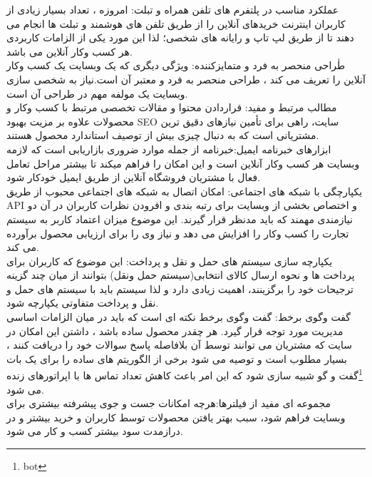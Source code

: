 \documentclass[12pt]{report}
\begin{document}
عملکرد مناسب در پلتفرم های تلفن همراه و تبلت: امروزه ، تعداد بسیار زیادی از کاربران اینترنت خریدهای آنلاین را از طریق تلفن های هوشمند و تبلت ها انجام می دهند تا از طریق لپ تاپ و رایانه های شخصی؛ لذا این مورد یکی از الزامات کاربردی هر کسب وکار آنلاین می باشد.\\
طٰراحی منحصر به فرد و متمایزکننده: ویژگی دیگری که یک وبسایت یک کسب وکار آنلاین را تعریف می کند ، طراحی منحصر به فرد و معتبر آن است.نیاز به شخصی سازی وبسایت یک مولفه مهم در طراحی آن است.\\
مطالب مرتبط و مفید: قراردادن محتوا و مقالات تخصصی مرتبط با کسب وکار و محصولات علاوه بر مزیت بهبود SEO سایت، راهی برای تأمین نیازهای دقیق ترین مشتریانی است که به دنبال چیزی بیش از توصیف استاندارد محصول هستند.\\
ابزارهای خبرنامه ایمیل:خبرنامه از جمله موارد ضروری بازاریابی است که لازمه وبسایت هر کسب وکار آنلاین است و  این امکان را فراهم میکند تا بیشتر مراحل تعامل فعال با مشتریان فروشگاه آنلاین از طریق ایمیل خودکار شود.\\ 
یکپارچگی با شبکه های اجتماعی: امکان اتصال به  شبکه های اجتماعی محبوب از طریق API و اختصاص بخشی از وبسایت برای رتبه بندی و افرودن نظرات کاربران در آن دو نیازمندی مهمند که باید مدنظر قرار گیرند. این  موضوع میزان اعتماد کاربر به سیستم تجارت را کسب وکار را افزایش می دهد و نیاز وی را برای ارزیابی محصول برآورده می کند.\\
یکپارچه سازی سیستم های حمل و نقل و پرداخت: این موضوع که کاربران برای پرداخت ها و نحوه ارسال کالای انتخابی(سیستم حمل ونقل) بتوانند از میان چند گزینه ترجیحات خود را برگزینند، اهمیت زیادی دارد و لذا سیستم باید با سیستم های حمل و نقل و پرداخت متفاوتی یکپارچه شود.\\
گفت وگوی برخط: گفت وگوی برخط نکته ای است که باید در میان الزامات اساسی مدیریت مورد توجه قرار گیرد. هر چقدر محصول ساده باشد ، داشتن این امکان در سایت که مشتریان می توانند توسط آن بلافاصله پاسخ سوالات خود را دریافت کنند ، بسیار مطلوب است و توصیه می شود برخی از الگوریتم های ساده را برای یک بات \footnote{\label{myfootnote}bot}گفت و گو شبیه سازی شود که این امر باعث کاهش تعداد تماس ها با اپراتورهای زنده می شود.\\
مجموعه ای مفید از فیلترها:هرچه امکانات جست و جوی پیشرفته بیشتری برای وبسایت فراهم شود، سبب بهتر یافتن محصولات توسط کاربران و خرید بیشتر و در درازمدت سود بیشتر کسب و کار می شود.
\end{document}
